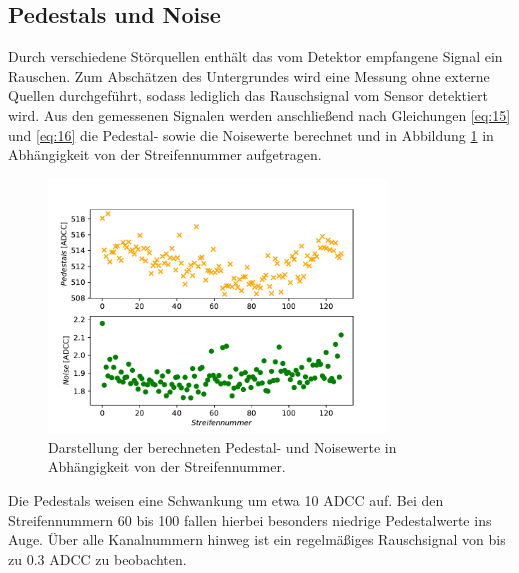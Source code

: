 \subsection{Pedestals und Noise}
\label{kap:Pedestal}
Durch verschiedene Störquellen enthält das vom Detektor empfangene Signal ein Rauschen. Zum Abschätzen des Untergrundes wird eine Messung ohne externe Quellen durchgeführt, sodass lediglich das Rauschsignal vom Sensor detektiert wird. Aus den gemessenen Signalen werden anschließend nach Gleichungen \eqref{eq:15} und \eqref{eq:16} die Pedestal- sowie die Noisewerte berechnet und in Abbildung \ref{fig:Pedestals} in Abhängigkeit von der Streifennummer aufgetragen.
\begin{figure}
  \centering
  \includegraphics[width=0.8\textwidth]{plots/Pedestals_Noise.pdf}
  \caption{Darstellung der berechneten Pedestal- und Noisewerte in Abhängigkeit von der Streifennummer.}
  \label{fig:Pedestals}
\end{figure}
\FloatBarrier
Die Pedestals weisen eine Schwankung um etwa 10 ADCC auf. Bei den Streifennummern 60 bis 100 fallen hierbei besonders niedrige Pedestalwerte ins Auge.
Über alle Kanalnummern hinweg ist ein regelmäßiges Rauschsignal von bis zu 0.3 ADCC zu beobachten.

